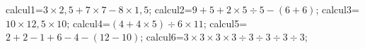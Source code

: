 \documentclass[exercice]{thedocument}%
\begin{document}
%
    \>calcul1=$3\times2,5+7\times7-8\times1,5$;%
    \>calcul2=$9+5+2\times5\div5-(6+6)$;%
    \>calcul3=$10\times12,5\times10$;%
    \>calcul4=$(4+4\times5)\div6\times11$;%
    \>calcul5=$2+2-1+6-4-(12-10)$;%
    \>calcul6=$3\times3\times3\times3\div3\div3\div3\div3$;%
\end{document}
